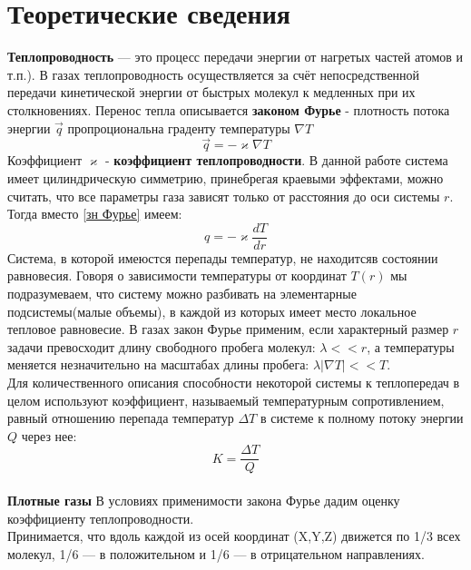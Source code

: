 \documentclass[12pt]{article}
\begin{document}
    \section{Теоретические сведения}
        \textbf{Теплопроводность} — это процесс передачи энергии от нагретых частей атомов и т.п.). В газах теплопроводность осуществляется за
        счёт непосредственной передачи кинетической энергии от быстрых молекул к медленных при их столкновениях. Перенос тепла
        описывается \textbf{законом Фурье} - плотность потока энергии $\vec{q}$ пропроциональна граденту температуры $\nabla T$
        \begin{equation}\label{зн Фурье}
            \vec{q} = - \varkappa \nabla T
        \end{equation}
        Коэффициент $\varkappa$ - \textbf{коэффициент теплопроводности}. В данной работе система имеет цилиндрическую симметрию, принебрегая краевыми эффектами,
        можно считать, что все параметры газа зависят только от расстояния до оси системы $r$. Тогда вместо \ref{зн Фурье} имеем:
        \begin{equation}
            q = - \varkappa \frac{dT}{dr}
        \end{equation}
        Система, в которой имеюстся перепады температур, не находитсяв состоянии равновесия. Говоря о зависимости температуры от координат $T(r)$ мы подразумеваем, что систему
        можно разбивать на элементарные подсистемы(малые объемы), в каждой из которых имеет место локальное тепловое равновесие. В газах
        закон Фурье применим, если характерный размер $r$ задачи превосходит длину свободного пробега молекул: $\lambda << r$, а температуры меняется незначительно на масштабах
        длины пробега: $\lambda|\nabla T| << T$.\\
        Для количественного описания способности некоторой системы к теплопередач в целом используют коэффициент, называемый температурным сопротивлением,
        равный отношению перепада температур $\Delta T$ в системе к полному потоку энергии $Q$ через нее:
        \begin{equation}\label{q = }
            K = \frac{\Delta T}{Q}
        \end{equation}\\
        \textbf{Плотные газы} В условиях применимости закона Фурье дадим оценку коэффициенту теплопроводности.\\
        Принимается, что вдоль каждой из осей координат (X,Y,Z) движется по 1/3 всех молекул, 1/6 — в положительном
        и 1/6 — в отрицательном направлениях.\\
\end{document}
